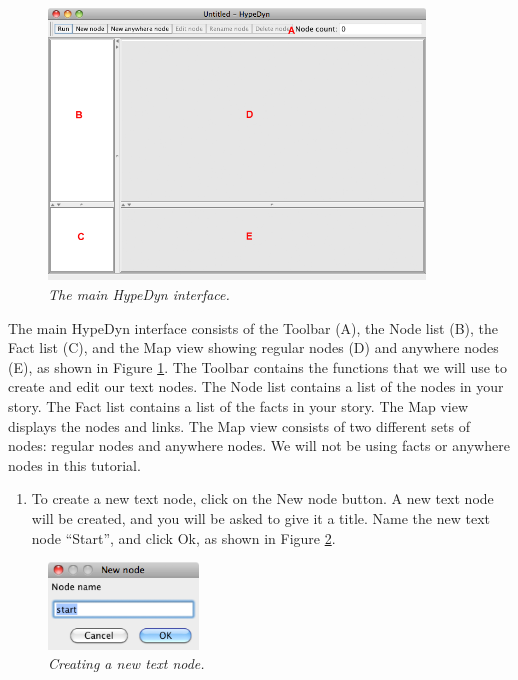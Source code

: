 \documentclass{article}
\begin{document}
\begin{figure}[ht]
  \centering
  \includegraphics[width=10cm]{images/hypedyn-tutorial-1-figure-2}
  \caption{\textit{The main HypeDyn interface.}}
  \label{fig:tut1:hypedyn}
\end{figure} 

The main HypeDyn interface consists of the Toolbar (A), the Node list (B), the
Fact list (C), and the Map view showing regular nodes (D) and anywhere nodes (E),
as shown in Figure \ref{fig:tut1:hypedyn}. The Toolbar contains the functions that we
will use to create and edit our text nodes. The Node list contains a list of the
nodes in your story. The Fact list contains a list of the facts in your story.
The Map view displays the nodes and links. The Map view consists of two different
sets of nodes: regular nodes and anywhere nodes. We will not be using facts or
anywhere nodes in this tutorial.

\begin{enumerate}
  \item To create a new text node, click on the New node button. A new text node
  will be created, and you will be asked to give it a title. Name the new text
  node ``Start'', and click Ok, as shown in Figure \ref{fig:tut1:new_node}.
\end{enumerate}

 
\begin{figure}[ht]
  \centering
  \includegraphics[width=4cm]{images/hypedyn-tutorial-1-figure-3}
  \caption{\textit{Creating a new text node.}}
  \label{fig:tut1:new_node}
\end{figure} 
\end{document}
